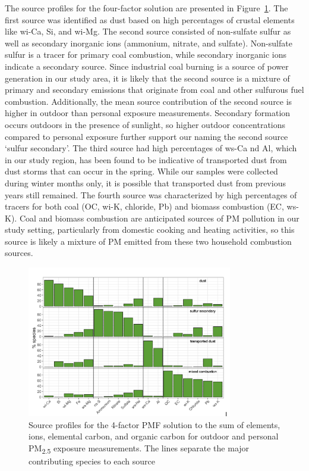 \documentclass[
  letterpaper,
  DIV=11,
  numbers=noendperiod]{scrartcl}
\begin{document}
The source profiles for the four-factor solution are presented in
Figure~\ref{fig-source-figure}. The first source was identified as dust
based on high percentages of crustal elements like wi-Ca, Si, and wi-Mg.
The second source consisted of non-sulfate sulfur as well as secondary
inorganic ions (ammonium, nitrate, and sulfate). Non-sulfate sulfur is a
tracer for primary coal combustion, while secondary inorganic ions
indicate a secondary source. Since industrial coal burning is a source
of power generation in our study area, it is likely that the second
source is a mixture of primary and secondary emissions that originate
from coal and other sulfurous fuel combustion. Additionally, the mean
source contribution of the second source is higher in outdoor than
personal exposure measurements. Secondary formation occurs outdoors in
the presence of sunlight, so higher outdoor concentrations compared to
personal exposure further support our naming the second source `sulfur
secondary'. The third source had high percentages of ws-Ca nd Al, which
in our study region, has been found to be indicative of transported dust
from dust storms that can occur in the spring. While our samples were
collected during winter months only, it is possible that transported
dust from previous years still remained. The fourth source was
characterized by high percentages of tracers for both coal (OC, wi-K,
chloride, Pb) and biomass combustion (EC, ws-K). Coal and biomass
combustion are anticipated sources of PM pollution in our study setting,
particularly from domestic cooking and heating activities, so this
source is likely a mixture of PM emitted from these two household
combustion sources.

\begin{figure}[H]

{\centering \includegraphics[width=0.8\textwidth,height=\textheight]{images/source-figure.png}

}

\caption{\label{fig-source-figure}Source profiles for the 4-factor PMF
solution to the sum of elements, ions, elemental carbon, and organic
carbon for outdoor and personal PM\textsubscript{2.5} exposure
measurements. The lines separate the major contributing species to each
source}

\end{figure}
\end{document}
